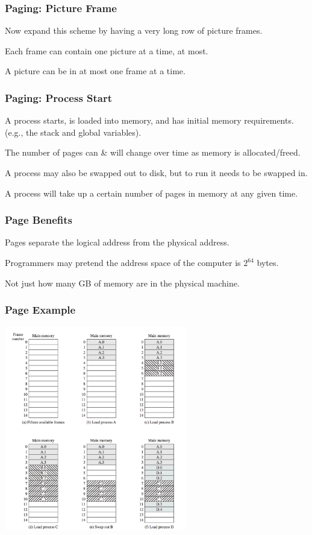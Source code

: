 \begin{frame}
\frametitle{Paging: Picture Frame}


Now expand this scheme by having a very long row of picture frames. 

Each frame can contain one picture at a time, at most. 

A picture can be in at most one frame at a time. 

\end{frame}

\begin{frame}
\frametitle{Paging: Process Start}

A process starts, is loaded into memory, and has initial memory requirements. \\
\quad (e.g., the stack and global variables).

The number of pages can \& will change over time as memory is allocated/freed. 

A process may also be swapped out to disk, but to run it needs to be swapped in. 

A process will take up a certain number of pages in memory at any given time.

\end{frame}

\begin{frame}
\frametitle{Page Benefits}

Pages separate the logical address from the physical address.

Programmers may pretend the address space of the computer is $2^{64}$ bytes.

Not just how many GB of memory are in the physical machine. 

\end{frame}

\begin{frame}
\frametitle{Page Example}

\begin{center}
\includegraphics[width=0.6\textwidth]{images/loading-pages.png}
\end{center}


\end{frame}

